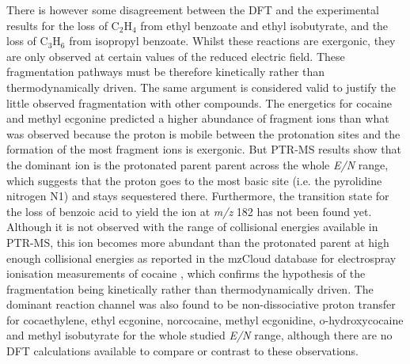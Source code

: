 There is however  some disagreement between the DFT and the experimental results  for the loss of C$_2$H$_4$ from ethyl benzoate and ethyl isobutyrate, and the loss of C$_3$H$_6$ from isopropyl benzoate.
%
Whilst these reactions are exergonic, they are only observed at certain values of the reduced electric field.
%
These fragmentation pathways must be therefore kinetically rather than thermodynamically driven.
%
The same argument is considered valid to justify the little observed fragmentation with other compounds.
%
The energetics for cocaine and methyl ecgonine predicted a higher abundance of fragment ions than what was observed because the proton is mobile between the protonation sites and the formation of the most fragment ions is exergonic.
%
But PTR-MS results show that the dominant ion is the protonated parent parent across the whole \textit{E/N} range, which suggests that the proton goes to the most basic site (i.e. the pyrolidine nitrogen N1) and stays sequestered there.
%
Furthermore, the transition state for the loss of benzoic acid to yield the ion at \textit{m/z} 182 has not been found yet.
%
Although it is not observed with the range of collisional energies available in PTR-MS, this ion becomes more abundant than the protonated parent at high enough collisional energies as reported in the mzCloud database for electrospray ionisation measurements of cocaine \cite{mzcloudCOC}, which confirms the hypothesis of the fragmentation being kinetically rather than thermodynamically driven.
%
%
The dominant reaction channel was also found to be non-dissociative proton transfer for cocaethylene, ethyl ecgonine, norcocaine, methyl ecgonidine, o-hydroxycocaine and methyl isobutyrate for the whole studied \textit{E/N} range, although there are no DFT calculations available to compare or contrast to these observations.




















%



